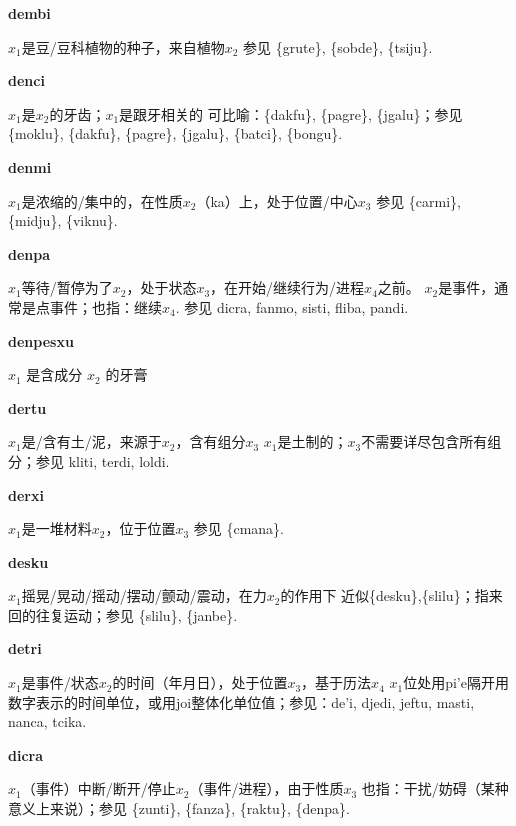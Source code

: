\documentclass[notitlepage,twocolumn,a4paper,10pt]{book}
\begin{document}
{\sffamily\bfseries dembi}\enspace {\ttfamily\bfseries[deb]}  $x_1$是豆\slash{}豆科植物的种子，来自植物$x_2$ \textemdash{} 参见 \{grute\}, \{sobde\}, \{tsiju\}.

{\sffamily\bfseries denci}\enspace {\ttfamily\bfseries[den     de'i]}  $x_1$是$x_2$的牙齿；$x_1$是跟牙相关的 \textemdash{} 可比喻：\{dakfu\}, \{pagre\}, \{jgalu\}；参见 \{moklu\}, \{dakfu\}, \{pagre\}, \{jgalu\}, \{batci\}, \{bongu\}.

{\sffamily\bfseries denmi}\enspace {\ttfamily\bfseries[dem]}  $x_1$是浓缩的\slash{}集中的，在性质$x_2$（ka）上，处于位置\slash{}中心$x_3$ \textemdash{} 参见 \{carmi\}, \{midju\}, \{viknu\}.

{\sffamily\bfseries denpa}\enspace {\ttfamily\bfseries[dep     de'a]}  $x_1$等待\slash{}暂停为了$x_2$，处于状态$x_3$，在开始\slash{}继续行为\slash{}进程$x_4$之前。 \textemdash{} $x_2$是事件，通常是点事件；也指：继续$x_4$. 参见 {dicra}, {fanmo}, {sisti}, {fliba}, {pandi}.

{\sffamily\bfseries denpesxu} $x_1$ 是含成分 $x_2$ 的牙膏

{\sffamily\bfseries dertu}\enspace {\ttfamily\bfseries[der     de'u]}  $x_1$是\slash{}含有土\slash{}泥，来源于$x_2$，含有组分$x_3$ \textemdash{} $x_1$是土制的；$x_3$不需要详尽包含所有组分；参见 {kliti}, {terdi}, {loldi}.

{\sffamily\bfseries derxi}\enspace {\ttfamily\bfseries[    dre]}  $x_1$是一堆材料$x_2$，位于位置$x_3$ \textemdash{} 参见 \{cmana\}.

{\sffamily\bfseries desku}\enspace {\ttfamily\bfseries[des]}  $x_1$摇晃\slash{}晃动\slash{}摇动\slash{}摆动\slash{}颤动\slash{}震动，在力$x_2$的作用下 \textemdash{} 近似\{desku\},\{slilu\}；指来回的往复运动；参见 \{slilu\}, \{janbe\}.

{\sffamily\bfseries detri}\enspace {\ttfamily\bfseries[det]}  $x_1$是事件\slash{}状态$x_2$的时间（年月日），处于位置$x_3$，基于历法$x_4$ \textemdash{} $x_1$位处用pi'e隔开用数字表示的时间单位，或用joi整体化单位值；参见：{de'i}, {djedi}, {jeftu}, {masti}, {nanca}, {tcika}.

{\sffamily\bfseries dicra}\enspace {\ttfamily\bfseries[dir]}  $x_1$（事件）中断\slash{}断开\slash{}停止$x_2$（事件\slash{}进程），由于性质$x_3$ \textemdash{} 也指：干扰\slash{}妨碍（某种意义上来说）；参见 \{zunti\}, \{fanza\}, \{raktu\}, \{denpa\}.
\end{document}

